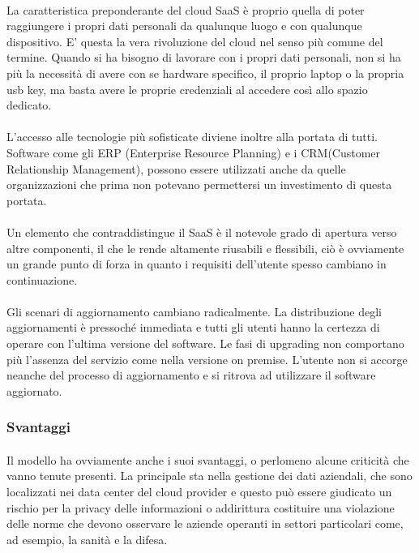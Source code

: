 \paragraph{}
La caratteristica preponderante del cloud SaaS è proprio quella di poter raggiungere i propri dati personali da qualunque luogo e con qualunque dispositivo. E' questa la vera rivoluzione del cloud nel senso più comune del termine. Quando si ha bisogno di lavorare con i propri dati personali, non si ha più la necessità di avere con se hardware specifico, il proprio laptop o la propria usb key, ma basta avere le proprie credenziali al accedere così allo spazio dedicato. 
\paragraph{}
L'accesso alle tecnologie più sofisticate diviene inoltre alla portata di tutti. Software come gli ERP (Enterprise Resource Planning) e i CRM(Customer Relationship Management), possono essere utilizzati anche da quelle organizzazioni che prima non potevano permettersi un investimento di questa portata.
\paragraph{} 
Un elemento che contraddistingue il SaaS è il notevole grado di apertura verso altre componenti, il che le rende altamente riusabili e flessibili, ciò è ovviamente un grande punto di forza in quanto i requisiti dell'utente spesso cambiano in continuazione.
\paragraph{}
Gli scenari di aggiornamento cambiano radicalmente. La distribuzione degli aggiornamenti è pressoché immediata e tutti gli utenti hanno la certezza di operare con l'ultima versione del software. Le fasi di upgrading non comportano più l'assenza del servizio come nella versione on premise. L'utente non si accorge neanche del processo di aggiornamento e si ritrova ad utilizzare il software aggiornato.
\subsubsection{Svantaggi}
\paragraph{}
Il modello ha ovviamente anche i suoi svantaggi, o perlomeno alcune criticità che vanno tenute presenti. La principale sta nella gestione dei dati aziendali, che sono localizzati nei data center del cloud provider e questo può essere giudicato un rischio per la privacy delle informazioni o addirittura costituire una violazione delle norme che devono osservare le aziende operanti in settori particolari come, ad esempio, la sanità e la difesa.
